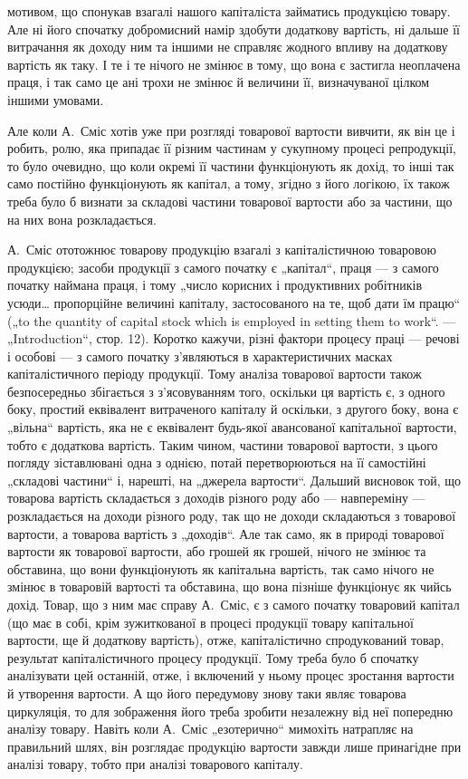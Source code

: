 \parcont{}  %
мотивом, що спонукав взагалі нашого капіталіста займатись продукцією
товару. Але ні його спочатку добромисний намір здобути додаткову
вартість, ні дальше її витрачання як доходу ним та іншими не справляє
жодного впливу на додаткову вартість як таку. І те і те нічого не змінює
в тому, що вона є застигла неоплачена праця, і так само це ані
трохи не змінює й величини її, визначуваної цілком іншими умовами.

Але коли А.~Сміс хотів уже при розгляді товарової вартости вивчити,
як він це і робить, ролю, яка припадає її різним частинам у сукупному
процесі репродукції, то було очевидно, що коли окремі її частини
функціонують як дохід, то інші так само постійно функціонують як капітал,
а тому, згідно з його логікою, їх також треба було б визнати за
складові частини товарової вартости або за частини, що на них вона
розкладається.

А.~Сміс ототожнює товарову продукцію взагалі з капіталістичною
товаровою продукцією; засоби продукції з самого початку є „капітал“,
праця — з самого початку наймана праця, і тому „число корисних і продуктивних
робітників усюди\dots{} пропорційне величині капіталу, застосованого
на те, щоб дати їм працю“ („to the quantity of capital stock which
is employed in setting them to work“. — „Introduction“, стор. 12). Коротко
кажучи, різні фактори процесу праці — речові і особові — з самого початку
з’являються в характеристичних масках капіталістичного періоду
продукції. Тому аналіза товарової вартости також безпосередньо збігається
з з’ясовуванням того, оскільки ця вартість є, з одного боку, простий
еквівалент витраченого капіталу й оскільки, з другого боку, вона є
„вільна“ вартість, яка не є еквівалент будь-якої авансованої капітальної
вартости, тобто є додаткова вартість. Таким чином, частини товарової
вартости, з цього погляду зіставлювані одна з однією, потай перетворюються
на її самостійні „складові частини“ і, нарешті, на „джерела вартости“.
Дальший висновок той, що товарова вартість складається з доходів
різного роду або — навпереміну — розкладається на доходи різного
роду, так що не доходи складаються з товарової вартости, а товарова
вартість з „доходів“. Але так само, як в природі товарової вартости як
товарової вартости, або грошей як грошей, нічого не змінює та обставина,
що вони функціонують як капітальна вартість, так само нічого не
змінює в товаровій вартості та обставина, що вона пізніше функціонує
як чийсь дохід. Товар, що з ним має справу А.~Сміс, є з самого початку
товаровий капітал (що має в собі, крім зужиткованої в процесі продукції
товару капітальної вартости, ще й додаткову вартість), отже, капіталістично
спродукований товар, результат капіталістичного процесу
продукції. Тому треба було б спочатку аналізувати цей останній, отже,
і включений у ньому процес зростання вартости й утворення вартости.
А що його передумову знову таки являє товарова циркуляція, то для
зображення його треба зробити незалежну від неї попередню аналізу
товару. Навіть коли А.~Сміс „езотерично“ мимохіть натрапляє на правильний
шлях, він розглядає продукцію вартости завжди лише принагідне
при аналізі товару, тобто при аналізі товарового капіталу.
